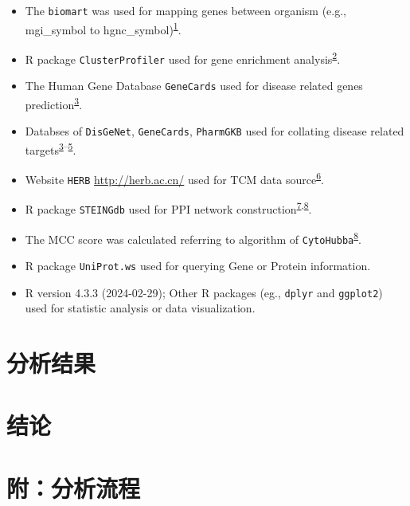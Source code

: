 \documentclass[
]{article}
\providecommand{\tightlist}{%
  \setlength{\itemsep}{0pt}\setlength{\parskip}{0pt}}
\begin{document}
\begin{itemize}
\tightlist
\item
  The \texttt{biomart} was used for mapping genes between organism (e.g., mgi\_symbol to hgnc\_symbol)\textsuperscript{\protect\hyperlink{ref-MappingIdentifDurinc2009}{1}}.
\item
  R package \texttt{ClusterProfiler} used for gene enrichment analysis\textsuperscript{\protect\hyperlink{ref-ClusterprofilerWuTi2021}{2}}.
\item
  The Human Gene Database \texttt{GeneCards} used for disease related genes prediction\textsuperscript{\protect\hyperlink{ref-TheGenecardsSStelze2016}{3}}.
\item
  Databses of \texttt{DisGeNet}, \texttt{GeneCards}, \texttt{PharmGKB} used for collating disease related targets\textsuperscript{\protect\hyperlink{ref-TheGenecardsSStelze2016}{3}--\protect\hyperlink{ref-PharmgkbAWorBarbar2018}{5}}.
\item
  Website \texttt{HERB} \url{http://herb.ac.cn/} used for TCM data source\textsuperscript{\protect\hyperlink{ref-HerbAHighThFang2021}{6}}.
\item
  R package \texttt{STEINGdb} used for PPI network construction\textsuperscript{\protect\hyperlink{ref-TheStringDataSzklar2021}{7},\protect\hyperlink{ref-CytohubbaIdenChin2014}{8}}.
\item
  The MCC score was calculated referring to algorithm of \texttt{CytoHubba}\textsuperscript{\protect\hyperlink{ref-CytohubbaIdenChin2014}{8}}.
\item
  R package \texttt{UniProt.ws} used for querying Gene or Protein information.
\item
  R version 4.3.3 (2024-02-29); Other R packages (eg., \texttt{dplyr} and \texttt{ggplot2}) used for statistic analysis or data visualization.
\end{itemize}

\hypertarget{results}{%
\section{分析结果}\label{results}}

\hypertarget{dis}{%
\section{结论}\label{dis}}

\hypertarget{workflow}{%
\section{附：分析流程}\label{workflow}}
\end{document}

